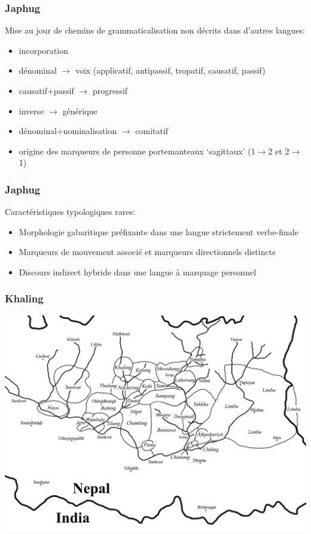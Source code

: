 \documentclass[xcolor=table]{beamer}
\begin{document}
\begin{frame} 
\frametitle{Japhug}
Mise au jour de chemins de grammaticalisation non décrits dans d'autres langues:
\begin{itemize}[<+->]
\item incorporation
\item dénominal $\rightarrow$ voix (applicatif, antipassif, tropatif, causatif, passif)
\item causatif+passif $\rightarrow$ progressif
\item inverse $\rightarrow$ générique
\item dénominal+nominalisation $\rightarrow$  comitatif
\item origine des marqueurs de personne portemanteaux `sagittaux' (1$\rightarrow$2 et 2$\rightarrow$1)
\end{itemize}
\end{frame} 


\begin{frame} 
\frametitle{Japhug}
Caractéristiques typologiques rares:
\begin{itemize}[<+->]
\item Morphologie gabaritique préfixante dans une langue strictement verbe-finale
\item Marqueurs de mouvement associé et marqueurs directionnels distincts
\item Discours indirect hybride dans une langue à marquage personnel
\end{itemize}
\end{frame} 

\begin{frame} 
\frametitle{Khaling}

\includegraphics[width=1\textwidth]{Kirant.jpeg} 
\end{frame} 
\end{document}
